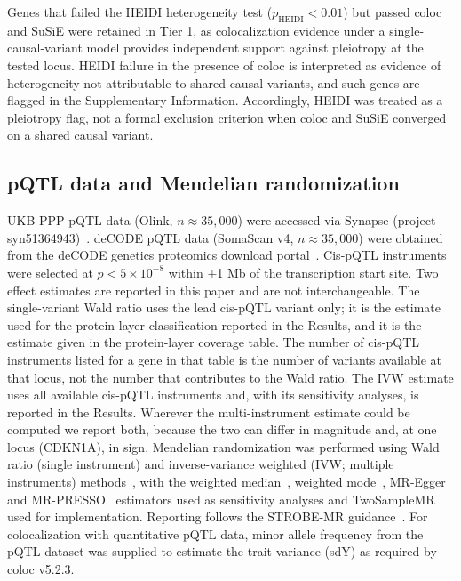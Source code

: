 \documentclass[11pt,a4paper]{article}
\begin{document}
Genes that failed the HEIDI heterogeneity test ($p_{\text{HEIDI}} < 0.01$)
but passed coloc and SuSiE were retained in Tier 1, as colocalization evidence
under a single-causal-variant model provides independent support against
pleiotropy at the tested locus. HEIDI failure in the presence of coloc is
interpreted as evidence of heterogeneity not attributable to shared causal
variants, and such genes are flagged in the Supplementary Information. Accordingly,
HEIDI was treated as a pleiotropy flag, not a formal exclusion criterion
when coloc and SuSiE converged on a shared causal variant.

\subsection{pQTL data and Mendelian randomization}

UKB-PPP pQTL data (Olink, $n\approx35,000$) were accessed via Synapse
(project syn51364943)~\cite{sun2023plasma, sudlow2015ukbiobank}. deCODE pQTL data (SomaScan v4, $n\approx35,000$) were
obtained from the deCODE genetics proteomics download portal~\cite{ferkingstad2021large}. Cis-pQTL
instruments were selected at $p < 5\times10^{-8}$ within $\pm$1 Mb of the
transcription start site. Two effect estimates are reported in this paper and
are not interchangeable. The single-variant Wald ratio uses the lead cis-pQTL
variant only; it is the estimate used for the protein-layer
classification reported in the Results, and it is the estimate given in the
protein-layer coverage table. The number of cis-pQTL instruments listed for a
gene in that table is the number of variants available at that locus, not the
number that contributes to the Wald ratio. The IVW estimate uses all available
cis-pQTL instruments and, with its sensitivity analyses, is reported in the
Results. Wherever the multi-instrument estimate
could be computed we report both, because the two can differ in magnitude and,
at one locus (CDKN1A), in sign. Mendelian randomization was performed using
Wald ratio (single instrument) and inverse-variance weighted (IVW; multiple
instruments) methods~\cite{burgess2013ivw}, with the weighted median~\cite{bowden2016median},
weighted mode~\cite{hartwig2017mode}, MR-Egger~\cite{bowden2015egger} and
MR-PRESSO~\cite{verbanck2018presso} estimators used as sensitivity analyses and
TwoSampleMR~\cite{hemani2018mrbase} used for implementation. Reporting follows
the STROBE-MR guidance~\cite{skrivankova2021strobe}. For colocalization with quantitative pQTL data, minor
allele frequency from the pQTL dataset was supplied to estimate the trait
variance (sdY) as required by coloc v5.2.3.
\end{document}
